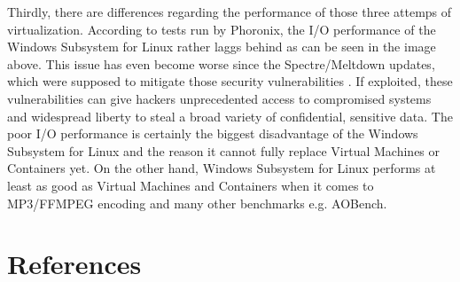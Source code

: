 \documentclass[utf8,biblatex, ngerman, english]{lni}
\begin{document}
Thirdly, there are differences regarding the performance of those three attemps of virtualization. According to tests run by Phoronix, the I/O performance of the Windows Subsystem for Linux rather laggs behind as can be seen in the image above. This issue has even become worse since the Spectre/Meltdown updates, which were supposed to mitigate those security vulnerabilities . \glqq If exploited, these vulnerabilities can give hackers unprecedented access to compromised systems and widespread liberty to steal a broad variety of confidential, sensitive data. \grqq \cite{Md18} The poor I/O performance is certainly the biggest disadvantage of the Windows Subsystem for Linux and the reason it cannot fully replace Virtual Machines or Containers yet. On the other hand, Windows Subsystem for Linux performs at least as good as Virtual Machines and Containers when it comes to MP3/FFMPEG encoding and many other benchmarks e.g. AOBench.\cite{LP18}

\newpage
\section{References}
\printbibliography
\end{document}
